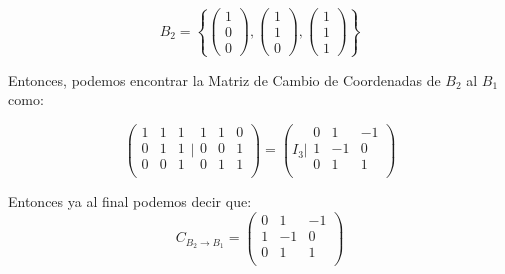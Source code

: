 \documentclass[12pt]{report}							    %
\begin{document}
        \begin{equation*}
            B_2 = \left\{
                \begin{pmatrix} 1 \\ 0 \\0 \end{pmatrix}, \begin{pmatrix} 1 \\ 1 \\0 \end{pmatrix},
                \begin{pmatrix} 1 \\ 1 \\1 \end{pmatrix}
            \right\}
        \end{equation*}

        Entonces, podemos encontrar la Matriz de Cambio de Coordenadas de $B_2$ al $B_1$ como:

        \begin{equation*}
            \left(
            \begin{matrix}
                1 & 1 & 1 \\
                0 & 1 & 1 \\
                0 & 0 & 1 \\
            \end{matrix}
            \Big|
            \begin{matrix}
                1 & 1 & 0 \\
                0 & 0 & 1 \\
                0 & 1 & 1 \\
            \end{matrix}
            \right)
            = \left(
            I_3
            \big|
            \begin{matrix}
                0 & 1 & -1 \\
                1 & -1 & 0 \\
                0 & 1 & 1 \\
            \end{matrix}
            \right)
        \end{equation*}

        Entonces ya al final podemos decir que:
        \begin{equation*}
            C_{B_2 \to B_1} =
            \begin{pmatrix}
                0 & 1 & -1 \\
                1 & -1 & 0 \\
                0 & 1 & 1 \\
            \end{pmatrix}
        \end{equation*}
\end{document}
